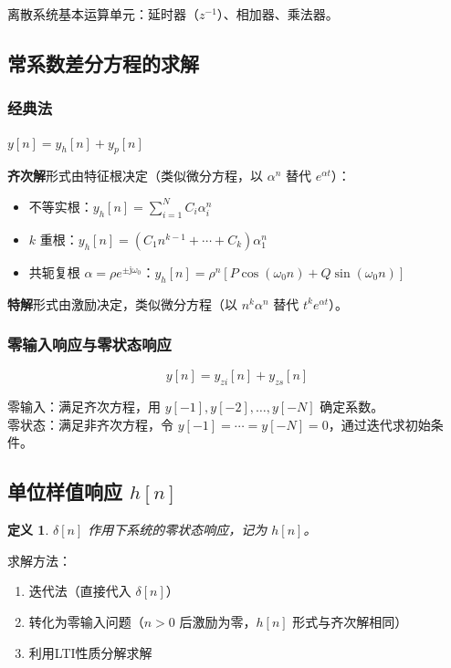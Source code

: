 \documentclass[11pt,a4paper]{ctexart}
\newtheorem{definition}{定义}[section]
\newcommand{\jj}{\mathrm{j}}            %
\newcommand{\dirac}{\delta}             %
\begin{document}
离散系统基本运算单元：延时器（$z^{-1}$）、相加器、乘法器。

\subsection{常系数差分方程的求解}

\subsubsection{经典法}
$y[n] = y_h[n] + y_p[n]$

\textbf{齐次解}形式由特征根决定（类似微分方程，以 $\alpha^n$ 替代 $e^{\alpha t}$）：
\begin{itemize}
    \item 不等实根：$y_h[n] = \sum_{i=1}^{N} C_i\alpha_i^n$
    \item $k$ 重根：$y_h[n] = (C_1 n^{k-1} + \cdots + C_k)\alpha_1^n$
    \item 共轭复根 $\alpha = \rho e^{\pm\jj\omega_0}$：$y_h[n] = \rho^n[P\cos(\omega_0 n) + Q\sin(\omega_0 n)]$
\end{itemize}

\textbf{特解}形式由激励决定，类似微分方程（以 $n^k\alpha^n$ 替代 $t^k e^{\alpha t}$）。

\subsubsection{零输入响应与零状态响应}
\[
y[n] = y_{zi}[n] + y_{zs}[n]
\]

零输入：满足齐次方程，用 $y[-1], y[-2], \ldots, y[-N]$ 确定系数。\\
零状态：满足非齐次方程，令 $y[-1] = \cdots = y[-N] = 0$，通过迭代求初始条件。

\subsection{单位样值响应 $h[n]$}

\begin{definition}
$\dirac[n]$ 作用下系统的零状态响应，记为 $h[n]$。
\end{definition}

求解方法：
\begin{enumerate}
    \item 迭代法（直接代入 $\dirac[n]$）
    \item 转化为零输入问题（$n > 0$ 后激励为零，$h[n]$ 形式与齐次解相同）
    \item 利用LTI性质分解求解
\end{enumerate}
\end{document}
